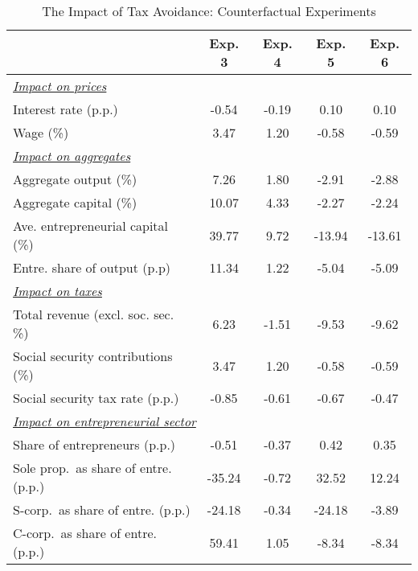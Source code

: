 \documentclass[11pt,english]{article}
\begin{document}
\begin{table}[htbp]
	\centering
	\begin{tabular}{lcccc}
		\toprule
		& {Exp. 3} & {Exp. 4} & {Exp. 5} & {Exp. 6} \\ 
		\midrule
		\multicolumn{5}{l}{\textit{\underline{Impact on prices}}} \\
		Interest rate (p.p.) & -0.54 &-0.19 & 0.10 & 0.10  \\
		Wage (\%) & 3.47 & 1.20 & -0.58 & -0.59 \\
		\midrule
		\multicolumn{4}{l}{\textit{\underline{Impact on aggregates}}} \\
		Aggregate output (\%) & 7.26 & 1.80 & -2.91 & -2.88 \\
		
		Aggregate capital (\%)& 10.07 & 4.33 & -2.27 & -2.24 \\
		Ave. entrepreneurial capital (\%) & 39.77 & 9.72 & -13.94 & -13.61 \\
		Entre. share of output (p.p)    & 11.34 &  1.22 & -5.04 & -5.09 \\
		\midrule
		\multicolumn{4}{l}{\textit{\underline{Impact on taxes}}} \\
		Total revenue (excl. soc. sec. \%) & 6.23 & -1.51 & -9.53 & -9.62 \\
		Social security contributions (\%) & 3.47 & 1.20 & -0.58 & -0.59 \\
		Social security tax rate (p.p.) & -0.85& -0.61 & -0.67 & -0.47 \\

		\midrule
		\multicolumn{4}{l}{\textit{\underline{Impact on entrepreneurial sector}}} \\
		Share of entrepreneurs (p.p.) & -0.51 & -0.37 & 0.42 & 0.35 \\
		Sole prop.~as share of entre. (p.p.)    & -35.24 &-0.72 & 32.52 & 12.24  \\
		S-corp.~as share of entre. (p.p.)       & -24.18 & -0.34 & -24.18 & -3.89 \\
		 C-corp.~as share of entre. (p.p.)       & 59.41 & 1.05 & -8.34 & -8.34 \\
		\bottomrule
	\end{tabular}
	\caption{The Impact of Tax Avoidance: Counterfactual Experiments}
	\label{tab:exp_summary}%
\end{table}
\end{document}
